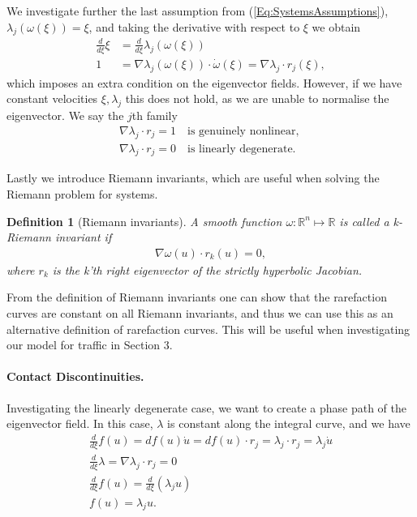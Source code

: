 \documentclass[10pt]{article}
\newtheorem{definition}{Definition}[section]
\numberwithin{equation}{section}
\begin{document}
We investigate further the last assumption from (\ref{Eq:SystemsAssumptions}), $ \lambda_j (\omega(\xi)) = \xi$, and taking the derivative with respect to $\xi$ we obtain
\begin{align*}
    \frac{d}{d\xi} \xi &= \frac{d}{d\xi} \lambda_j( \omega (\xi)) \\
    1 &= \nabla \lambda_j (\omega(\xi)) \cdot \dot \omega (\xi) = \nabla \lambda_j \cdot r_j(\xi),
    \label{Eq:DirectionOfLambda}
\end{align*} 
which imposes an extra condition on the eigenvector fields. However, if we have constant velocities $\xi, \lambda_j$ this does not hold, as we are unable to normalise the eigenvector. We say the $j$th family 
\begin{align*}
    \nabla \lambda_j \cdot r_j = 1 \quad \text{is genuinely nonlinear, } \\
    \nabla \lambda_j \cdot r_j = 0 \quad \text{is linearly degenerate. }
\end{align*}

Lastly we introduce Riemann invariants, which are useful when solving the Riemann problem for systems. \begin{definition}[Riemann invariants]
A smooth function $\omega : \mathbb{R}^n \mapsto \mathbb{R}$ is called a \textit{k-Riemann invariant} if 
\begin{align*}
    \nabla \omega(u) \cdot r_k (u) = 0,
\end{align*}
where $r_k$ is the k'th right eigenvector of the strictly hyperbolic Jacobian.
\end{definition}
From the definition of Riemann invariants one can show that the rarefaction curves are constant on all Riemann invariants, and thus we can use this as an alternative definition of rarefaction curves. This will be useful when investigating our model for traffic in Section $3$.  

\paragraph{Contact Discontinuities.}

Investigating the linearly degenerate case, we want to create a phase path of the eigenvector field. In this case, $\lambda$ is constant along the integral curve, and we have 
\begin{align*}
    \frac{d}{d\xi} f(u) = df(u) \dot u = df(u) \cdot r_j = \lambda_j \cdot r_j = \lambda_j \dot u \\
     \frac{d}{d\xi} \lambda = \nabla \lambda_j \cdot r_j = 0 \\
     \frac{d}{d\xi} f(u) =  \frac{d}{d\xi}( \lambda_j u ) \\
     f(u) = \lambda_j u. 
\end{align*}
\end{document}
